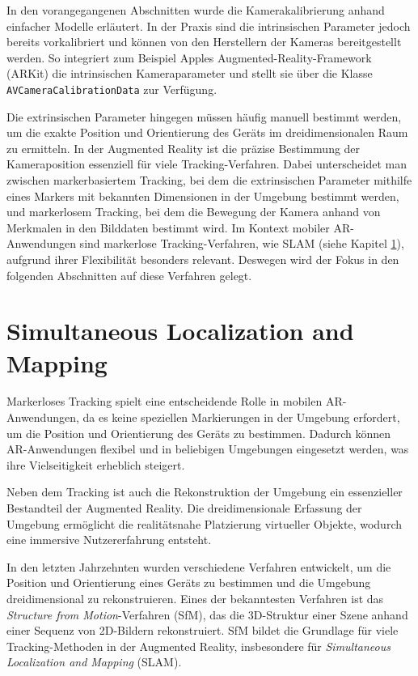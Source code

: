 In den vorangegangenen Abschnitten wurde die Kamerakalibrierung anhand einfacher Modelle erläutert. In der Praxis sind die intrinsischen Parameter jedoch bereits vorkalibriert und können von den Herstellern der Kameras bereitgestellt werden. So integriert zum Beispiel Apples Augmented-Reality-Framework (ARKit) die intrinsischen Kameraparameter und stellt sie über die Klasse \texttt{AVCameraCalibrationData} zur Verfügung. \cite{appledevdoc}

Die extrinsischen Parameter hingegen müssen häufig manuell bestimmt werden, um die exakte Position und Orientierung des Geräts im dreidimensionalen Raum zu ermitteln. In der Augmented Reality ist die präzise Bestimmung der Kameraposition essenziell für viele Tracking-Verfahren. Dabei unterscheidet man zwischen markerbasiertem Tracking, bei dem die extrinsischen Parameter mithilfe eines Markers mit bekannten Dimensionen in der Umgebung bestimmt werden, und markerlosem Tracking, bei dem die Bewegung der Kamera anhand von Merkmalen in den Bilddaten bestimmt wird. Im Kontext mobiler AR-Anwendungen sind markerlose Tracking-Verfahren, wie SLAM (siehe Kapitel \ref{SLAM}), aufgrund ihrer Flexibilität besonders relevant. Deswegen wird der Fokus in den folgenden Abschnitten auf diese Verfahren gelegt. \cite{doerner2022virtual, alam2024calibration}

\section{Simultaneous Localization and Mapping}\label{SLAM}

Markerloses Tracking spielt eine entscheidende Rolle in mobilen AR-Anwendungen, da es keine speziellen Markierungen in der Umgebung erfordert, um die Position und Orientierung des Geräts zu bestimmen. Dadurch können AR-Anwendungen flexibel und in beliebigen Umgebungen eingesetzt werden, was ihre Vielseitigkeit erheblich steigert. \cite{doerner2022virtual}

Neben dem Tracking ist auch die Rekonstruktion der Umgebung ein essenzieller Bestandteil der Augmented Reality. Die dreidimensionale Erfassung der Umgebung ermöglicht die realitätsnahe Platzierung virtueller Objekte, wodurch eine immersive Nutzererfahrung entsteht. \cite{doerner2022virtual}

In den letzten Jahrzehnten wurden verschiedene Verfahren entwickelt, um die Position und Orientierung eines Geräts zu bestimmen und die Umgebung dreidimensional zu rekonstruieren. Eines der bekanntesten Verfahren ist das \emph{Structure from Motion}-Verfahren (SfM), das die 3D-Struktur einer Szene anhand einer Sequenz von 2D-Bildern rekonstruiert. SfM bildet die Grundlage für viele Tracking-Methoden in der Augmented Reality, insbesondere für \emph{Simultaneous Localization and Mapping} (SLAM). \cite{doerner2022virtual, tourani2022vSLAMTrends}

